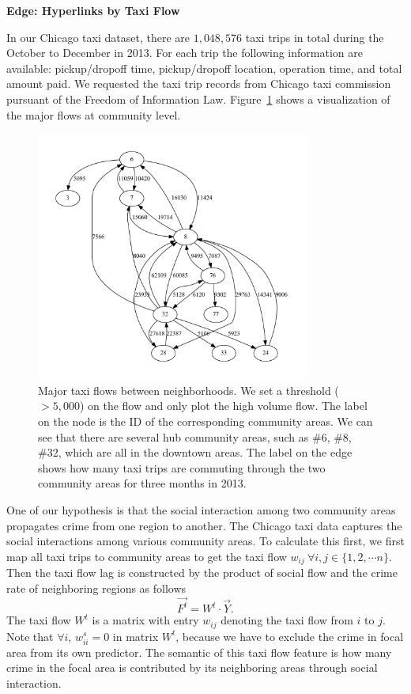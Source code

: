 \textbf{Edge: Hyperlinks by Taxi Flow}

In our Chicago taxi dataset, there are $1,048,576$ taxi trips in total during the October to December in 2013. For each trip the following information are available: pickup/dropoff time, pickup/dropoff location, operation time, and total amount paid. We requested the taxi trip records from Chicago taxi commission pursuant of the Freedom of Information Law.  Figure~\ref{fig:taxi-flow} shows a visualization of the major flows at community level.

\begin{figure}[htb]
\centering
\includegraphics[width=0.8\textwidth]{fig/taxiflow.pdf}
\caption{Major taxi flows between neighborhoods. We set a threshold ($> 5,000$) on the flow and only plot the high volume flow. The label on the node is the ID of the corresponding community areas. We can see that there are several hub community areas, such as \#6, \#8, \#32, which are all in the downtown areas. The label on the edge shows how many taxi trips are commuting through the two community areas for three months in 2013.}
\label{fig:taxi-flow}
\end{figure}


One of our hypothesis is that the social interaction among two community areas propagates crime from one region to another.
The Chicago taxi data captures the social interactions among various community areas. To calculate this first, we first map all taxi trips to community areas to get the taxi flow $w_{ij}\ \forall i,j \in \{1, 2, \cdots n\}$. Then the taxi flow lag is constructed by the product of social flow and the crime rate of neighboring regions as follows
\begin{equation}
\vec{F^t} = W^t \cdot \vec{Y}.
\label{eq:taxi}
\end{equation}
The taxi flow $W^t$ is a matrix with entry $w_{ij}$ denoting the taxi flow from $i$ to $j$. Note that $\forall i$, $w^s_{ii} = 0$ in matrix $W^t$, because we have to exclude the crime in focal area from its own predictor. The semantic of this taxi flow feature is how many crime in the focal area is contributed by its neighboring areas through social interaction.


